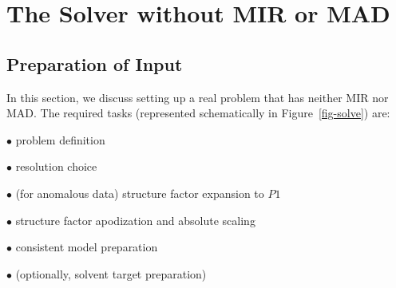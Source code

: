 \documentclass{report}
\begin{document}
\chapter {The Solver without MIR or MAD}
\label{solver}

\section {Preparation of Input}
\label{solver-preparation}

In this section, we discuss setting up a real problem that has neither
MIR nor MAD. The required tasks (represented 
schematically in Figure~\ref{fig-solve}) are: 

$\bullet$ problem definition

$\bullet$ resolution choice

$\bullet$ (for anomalous data) structure factor expansion to $P1$

$\bullet$ structure factor apodization and absolute scaling 

$\bullet$ consistent model preparation 

$\bullet$ (optionally, solvent target preparation)

\def\arrow#1{\put(#1,16){\vector(1,0){10}}}
\def\step#1{\put(2,8){\framebox(36,15)[l] {#1}}\arrow {40}}
\def\bigstep#1{\put(2,5){\framebox(36,20)[l] {#1}}\arrow {40}}
\def\morestep#1#2{\put(8,#1){\makebox(36,2)[l] {#2}}}
\def\runs#1#2{\put(50,#1){\makebox(40,8)[c] {#2}}}
\def\outcome#1#2{\put(104,{#1}){\makebox(50,8)[l] {{\it {#2}}}}}
\end{document}
